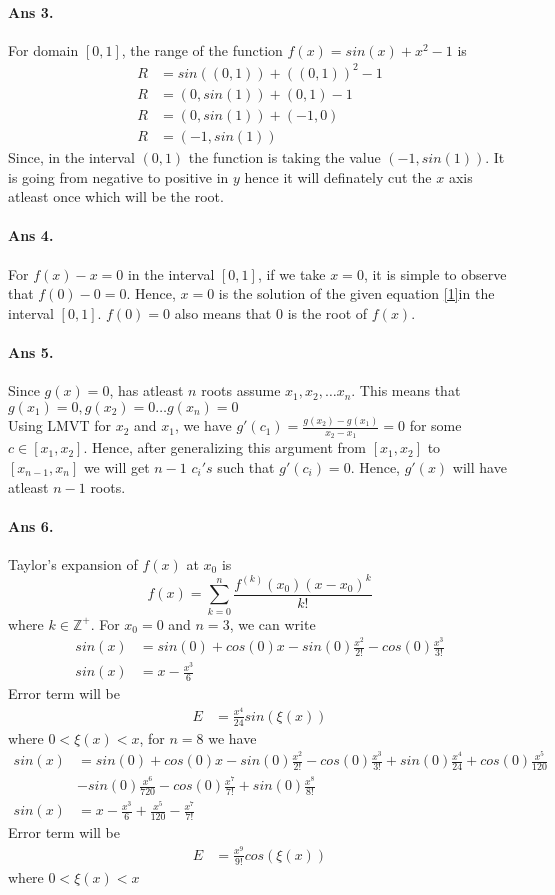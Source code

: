 \documentclass[12pt]{report}
\begin{document}
\paragraph*{Ans 3.} For domain $[0,1]$, the range of the function $f(x) = sin(x) + x^2 -1$ is
\begin{align*}
    R &= sin((0,1)) + ((0,1))^2 - 1\\
    R &= (0, sin(1)) + (0,1) -1 \\
    R &= (0, sin(1)) + (-1, 0)\\
    R &= (-1, sin(1))
\end{align*}
Since, in the interval $(0,1)$ the function is taking the value $(-1, sin(1))$. It is going from negative to positive in $y$ hence it will definately cut the $x$ axis atleast once which will be the root.
\paragraph*{Ans 4.} For $f(x) - x = 0 \label{1}$ in the interval $[0,1]$, if we take $ x= 0$, it is simple to observe that $ f(0) - 0 = 0$. Hence, $x= 0$ is the solution of the given equation \ref{1}in the interval $[0,1]$. $f(0) = 0$ also means that $0$ is the root of $f(x)$. 
\paragraph*{Ans 5.} Since $g(x) = 0$, has atleast $n$ roots assume $x_1, x_2, \dots x_n$. This means that $g(x_1) = 0, g(x_2) = 0 \dots g(x_n) = 0$\\
Using LMVT for $x_2$ and $x_1$, we have $g'(c_1) = \frac{g(x_2) - g(x_1)}{x_2 - x_1} = 0$ for some $c \in [x_1, x_2]$. Hence, after generalizing this argument from $[x_1, x_2]$ to $[x_{n-1}, x_n]$ we will get $n-1$ $c_i's$ such that $g'(c_i) = 0$. Hence, $g'(x)$ will have atleast $n-1$ roots. 
\paragraph*{Ans 6.} Taylor's expansion of $f(x)$ at $x_0$ is
$$ f(x) =  \sum\limits_{k=0}^{n} \frac{f^{(k)}(x_0) (x - x_0)^k}{k!} 
$$ where $k \in \mathbb{Z^+}$. For $x_0 = 0$ and $n=3$, we can write
\begin{align*}
    sin(x) &= sin(0) + cos(0)x - sin(0) \frac{x^2}{2!} - cos(0)\frac{x^3}{3!}\\
    sin(x) &= x - \frac{x^3}{6}
\end{align*}
Error term will be 
\begin{align*}
    E &= \frac{x^4}{24}sin(\xi(x))
\end{align*}
where $0 < \xi(x) < x$, for $n = 8$ we have
\begin{align*}
    sin(x) &= sin(0) + cos(0)x - sin(0) \frac{x^2}{2!} - cos(0)\frac{x^3}{3!} + sin(0) \frac{x^4}{24} + cos(0)\frac{x^5}{120} \\ &- sin(0)\frac{x^6}{720} - cos(0)\frac{x^7}{7!} + sin(0)\frac{x^8}{8!}\\
    sin(x) &= x - \frac{x^3}{6} + \frac{x^5}{120} - \frac{x^7}{7!}
\end{align*}
Error term will be
\begin{align*}
    E &= \frac{x^9}{9!}cos(\xi(x))
\end{align*}
where $0 < \xi(x) < x$
\end{document}
